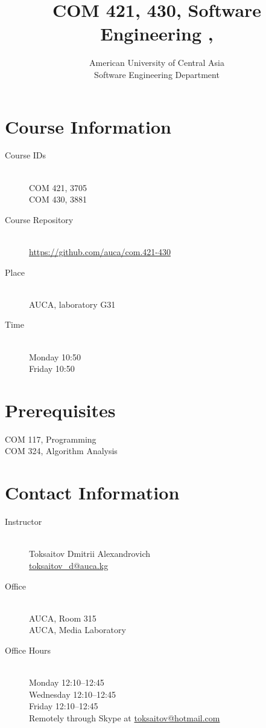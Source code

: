 \documentclass[12pt,a4paper,oneside]{article}
\newcommand{\R}[1]{\uppercase\expandafter{\romannumeral #1\relax}}
\begin{document}
    \title{COM 421, 430, Software Engineering \R{1}, \R{2}}
    \author{
        American University of Central Asia\\
        Software Engineering Department
    }
    \date{}
    \maketitle

    \section{Course Information}

        \begin{description}
            \item[Course IDs]\hfill\\
                COM 421, 3705\\
                COM 430, 3881
            \item[Course Repository]\hfill\\
                \url{https://github.com/auca/com.421-430}
            \item[Place]\hfill\\
                AUCA, laboratory G31
            \item[Time]\hfill\\
                Monday 10:50\\
                Friday 10:50
        \end{description}

    \section{Prerequisites}

        COM 117, Programming \R{2}\\
        COM 324, Algorithm Analysis

    \section{Contact Information}

        \begin{description}
            \item[Instructor]\hfill\\
                Toksaitov Dmitrii Alexandrovich\\
                \href{mailto:toksaitov_d@auca.kg}{toksaitov\_d@auca.kg}
            \item[Office]\hfill\\
                AUCA, Room 315\\
                AUCA, Media Laboratory
            \item[Office Hours]\hfill\\
                Monday 12:10--12:45\\
                Wednesday 12:10--12:45\\
                Friday 12:10--12:45\\
                Remotely through Skype at \href{mailto:toksaitov_d@auca.kg}{toksaitov@hotmail.com}
        \end{description}
\end{document}
